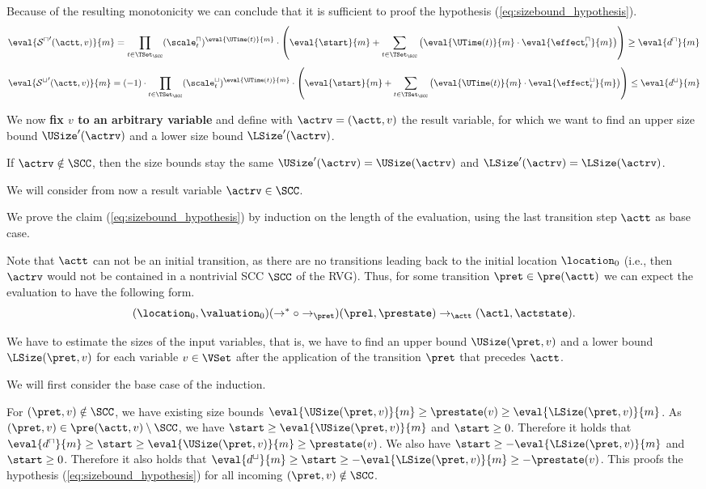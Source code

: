 Because of the resulting monotonicity we can conclude that it is sufficient to proof the hypothesis (\ref{eq:sizebound_hypothesis}). 
\[ \eval{{\mathcal{S}^\sqcap}'(\actt,v)}{m} =
   \prod_{t \in \TSet_\SCC} (\scale^\sqcap_t)^{\eval{\UTime(t)}{m}} \cdot \left( \eval{\start}{m} + \sum_{t \in \TSet_\SCC} \left( \eval{\UTime(t)}{m} \cdot \eval{\effect^\sqcap_t}{m} \right) \right) \geq \eval{d^\sqcap}{m} \]
\[ \eval{{\mathcal{S}^\sqcup}'(\actt,v)}{m} =
   (-1) \cdot \prod_{t \in \TSet_\SCC} (\scale^\sqcup_t)^{\eval{\UTime(t)}{m}} \cdot \left( \eval{\start}{m} + \sum_{t \in \TSet_\SCC} \left( \eval{\UTime(t)}{m} \cdot \eval{\effect^\sqcup_t}{m} \right) \right) \leq \eval{d^\sqcup}{m} \]

We now \textbf{fix $v$ to an arbitrary variable} and define with $\actrv = (\actt, v)$ the result variable, for which we want to find an upper size bound $\USize'(\actrv)$ and a lower size bound $\LSize'(\actrv)$.

If $\actrv \notin \SCC$, then the size bounds stay the same $\USize'(\actrv) = \USize(\actrv)$ and $\LSize'(\actrv) = \LSize(\actrv)$.

We will consider from now a result variable $\actrv \in \SCC$.

We prove the claim (\ref{eq:sizebound_hypothesis}) by induction on the length of the evaluation, using the last transition step $\actt$ as base case.

Note that $\actt$ can not be an initial transition, as there are no transitions leading back to the initial location $\location_0$
(i.e., then $\actrv$ would not be contained in a nontrivial SCC $\SCC$ of the RVG).
Thus, for some transition $\pret \in \pre(\actt)$ we can expect the evaluation to have the following form.
\[ (\location_0, \valuation_0) (\rightarrow^* \circ \rightarrow_\pret) (\prel, \prestate) \rightarrow_\actt (\actl, \actstate). \]

We have to estimate the sizes of the input variables, that is, we have to find an upper bound $\USize(\pret, v)$ and a lower bound $\LSize(\pret, v)$ for each variable $v \in \VSet$ after the application of the transition $\pret$ that precedes $\actt$.

We will first consider the base case of the induction.

For $(\pret, v) \notin \SCC$, we have existing size bounds $\eval{\USize(\pret, v)}{m} \geq \prestate(v) \geq \eval{\LSize(\pret, v)}{m}$.
As $(\pret, v) \in \pre(\actt, v) \setminus \SCC$, we have $\start \geq \eval{\USize(\pret, v)}{m}$ and $\start \geq 0$.
Therefore it holds that $\eval{d^\sqcap}{m} \geq \start \geq \eval{\USize(\pret, v)}{m} \geq \prestate(v)$.
We also have $\start \geq -\eval{\LSize(\pret, v)}{m}$ and $\start \geq 0$.
Therefore it also holds that $\eval{d^\sqcup}{m} \geq \start \geq -\eval{\LSize(\pret, v)}{m} \geq -\prestate(v)$.
This proofs the hypothesis (\ref{eq:sizebound_hypothesis}) for all incoming $(\pret, v) \notin \SCC$.

